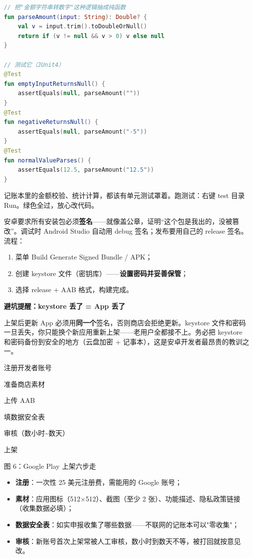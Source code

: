 \begin{lstlisting}[language=Kotlin]
// 把"金额字符串转数字"这种逻辑抽成纯函数
fun parseAmount(input: String): Double? {
    val v = input.trim().toDoubleOrNull()
    return if (v != null && v > 0) v else null
}

// 测试它（JUnit4）
@Test
fun emptyInputReturnsNull() {
    assertEquals(null, parseAmount(""))
}
@Test
fun negativeReturnsNull() {
    assertEquals(null, parseAmount("-5"))
}
@Test
fun normalValueParses() {
    assertEquals(12.5, parseAmount("12.5"))
}
\end{lstlisting}

记账本里的金额校验、统计计算，都该有单元测试罩着。跑测试：右键 test 目录 Run。绿色全过，放心改代码。


安卓要求所有安装包必须\textbf{签名}——就像盖公章，证明“这个包是我出的，没被篡改”。调试时 Android Studio 自动用 debug 签名；发布要用自己的 release 签名。流程：

\begin{enumerate}
  \item 菜单 Build Generate Signed Bundle / APK；
  \item 创建 keystore 文件（密钥库）——\textbf{设置密码并妥善保管}；
  \item 选择 release + AAB 格式，构建完成。
\end{enumerate}

\textbf{避坑提醒：keystore 丢了 = App 丢了}\par

上架后更新 App 必须用\textbf{同一个}签名，否则商店会拒绝更新。keystore 文件和密码一旦丢失，你只能换个新应用重新上架——老用户全都接不上。务必把 keystore 和密码备份到安全的地方（云盘加密 + 记事本），这是安卓开发者最昂贵的教训之一。


注册开发者账号

准备商店素材

上传 AAB

填数据安全表

审核（数小时\textasciitilde{}数天）

上架

\begin{center}\small\color{gray}图 6：Google Play 上架六步走\end{center}

\begin{itemize}
  \item \textbf{注册}：一次性 25 美元注册费，需能用的 Google 账号；
  \item \textbf{素材}：应用图标（512×512）、截图（至少 2 张）、功能描述、隐私政策链接（收集数据必填）；
  \item \textbf{数据安全表}：如实申报收集了哪些数据——不联网的记账本可以"零收集"；
  \item \textbf{审核}：新账号首次上架常被人工审核，数小时到数天不等，被打回就按意见改。
\end{itemize}

